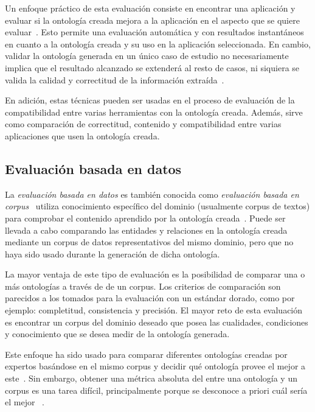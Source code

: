 Un enfoque práctico de esta evaluación consiste en encontrar una aplicación y evaluar si la ontología creada mejora a la aplicación en el aspecto que se quiere evaluar~\cite{ref:95}. Esto permite una evaluación automática y con resultados instantáneos en cuanto a la ontología creada y su uso en la aplicación seleccionada. En cambio, validar la ontología generada en un único caso de estudio no necesariamente implica que el resultado alcanzado se extenderá al resto de casos, ni siquiera se valida la calidad y correctitud de la información extraída~\cite{ref:34}.

En adición, estas técnicas pueden ser usadas en el proceso de evaluación de la compatibilidad entre varias herramientas con la ontología creada. Además, sirve como comparación de correctitud, contenido y compatibilidad entre varias aplicaciones que usen la ontología creada.

\subsection{Evaluación basada en datos}
La \textit{evaluación basada en datos} es también conocida como \textit{evaluación basada en corpus}~\cite{ref:96} utiliza conocimiento específico del dominio (usualmente corpus de textos)  para comprobar el contenido aprendido por la ontología creada~\cite{ref:28}. Puede ser llevada a cabo comparando las entidades y relaciones en la ontología creada mediante un corpus de datos representativos del mismo dominio, pero que no haya sido usado durante la generación de dicha ontología. 

La mayor ventaja de este tipo de evaluación es la posibilidad de comparar una o más ontologías a través de de un corpus. Los criterios de comparación son parecidos a los tomados para la evaluación con un estándar dorado, como por ejemplo: completitud, consistencia y precisión. El mayor reto de esta evaluación es encontrar un corpus del dominio deseado que posea las cualidades, condiciones y conocimiento que se desea medir de la ontología generada.

Este enfoque ha sido usado para comparar diferentes ontologías creadas por expertos basándose en el mismo corpus y decidir qué ontología provee el mejor  a este~\cite{ref:29}. Sin embargo, obtener una métrica absoluta del  entre una ontología y un corpus es una tarea difícil, principalmente porque se desconoce a priori cuál sería el mejor ~\cite{ref:34}.

